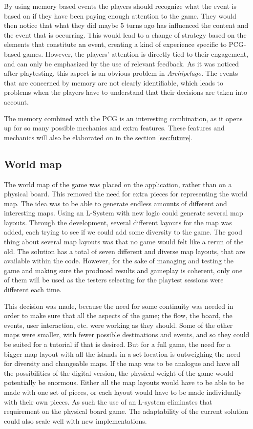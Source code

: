 By using memory based events the players should recognize what the event is based on if they have been paying enough attention to the game. They would then notice that what they did maybe 5 turns ago has influenced the content and the event that is occurring. This would lead to a change of strategy based on the elements that constitute an event, creating a kind of experience specific to PCG-based games. However, the players' attention is directly tied to their engagement, and can only be emphasized by the use of relevant feedback. As it was noticed after playtesting, this aspect is an obvious problem in \textit{Archipelago}. The events that are concerned by memory are not clearly identifiable, which leads to problems when the players have to understand that their decisions are taken into account. 

The memory combined with the PCG is an interesting combination, as it opens up for so many possible mechanics and extra features. These features and mechanics will also be elaborated on in the section \ref{sec:future}.

\subsection{World map}
The world map of the game was placed on the application, rather than on a physical board. This removed the need for extra pieces for representing the world map. The idea was to be able to generate endless amounts of different and interesting maps. Using an L-System with new logic could generate several map layouts. Through the development, several different layouts for the map was added, each trying to see if we could add some diversity to the game. The good thing about several map layouts was that no game would felt like a rerun of the old. The solution has a total of seven different and diverse map layouts, that are available within the code. However, for the sake of managing and testing the game and making sure the produced results and gameplay is coherent, only one of them will be used as the testers selecting for the playtest sessions were different each time. 

This decision was made, because the need for some continuity was needed in order to make sure that all the aspects of the game; the flow, the board, the events, user interaction, etc. were working as they should. Some of the other maps were smaller, with fewer possible destinations and events, and so they could be suited for a tutorial if that is desired. But for a full game, the need for a bigger map layout with all the islands in a set location is outweighing the need for diversity and changeable maps. If the map was to be analogue and have all the possibilities of the digital version, the physical weight of the game would potentially be enormous. Either all the map layouts would have to be able to be made with one set of pieces, or each layout would have to be made individually with their own pieces. As such the use of an L-system eliminates that requirement on the physical board game. The adaptability of the current solution could also scale well with new implementations.

